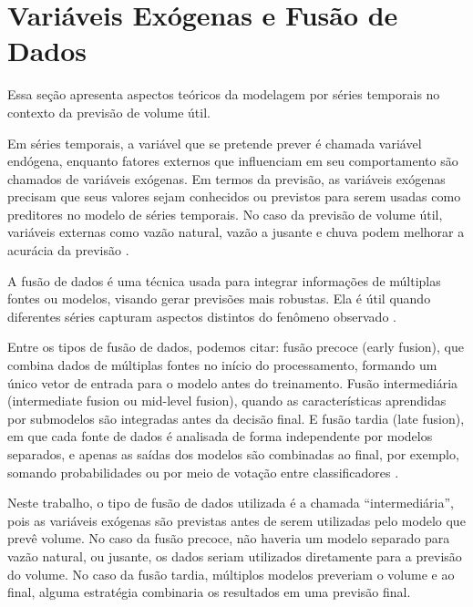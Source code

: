 \section{Variáveis Exógenas e Fusão de Dados}

Essa seção apresenta aspectos teóricos da modelagem por séries temporais no contexto da previsão de volume útil. 

Em séries temporais, a variável que se pretende prever é chamada variável endógena, enquanto fatores externos que influenciam em seu comportamento são chamados de variáveis exógenas. Em termos da previsão, as variáveis exógenas precisam que seus valores sejam conhecidos ou previstos para serem usadas como preditores no modelo de séries temporais. No caso da previsão de volume útil, variáveis externas como vazão natural, vazão a jusante e chuva podem melhorar a acurácia da previsão \cite{Qiu2025DualCausal}. 

A fusão de dados é uma técnica usada para integrar informações de múltiplas fontes ou modelos, visando gerar previsões mais robustas. Ela é útil quando diferentes séries capturam aspectos distintos do fenômeno observado \cite{Stahlschmidt2022Multimodal}. 

Entre os tipos de fusão de dados, podemos citar: fusão precoce (early fusion), que combina dados de múltiplas fontes no início do processamento, formando um único vetor de entrada para o modelo antes do treinamento. Fusão intermediária (intermediate fusion ou mid-level fusion), quando as características aprendidas por submodelos são integradas antes da decisão final. E fusão tardia (late fusion), em que cada fonte de dados é analisada de forma independente por modelos separados, e apenas as saídas dos modelos são combinadas ao final, por exemplo, somando probabilidades ou por meio de votação entre classificadores \cite{Boulahia2021Fusion}. 

Neste trabalho, o tipo de fusão de dados utilizada é a chamada “intermediária”, pois as variáveis exógenas são previstas antes de serem utilizadas pelo modelo que prevê volume. No caso da fusão precoce, não haveria um modelo separado para vazão natural, ou jusante, os dados seriam utilizados diretamente para a previsão do volume. No caso da fusão tardia, múltiplos modelos preveriam o volume e ao final, alguma estratégia combinaria os resultados em uma previsão final. 
